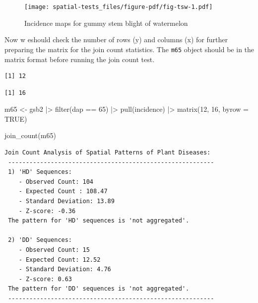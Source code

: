 \documentclass[
  letterpaper,
]{book}
\newenvironment{Shaded}{\begin{snugshade}}{\end{snugshade}}
\newcommand{\AttributeTok}[1]{\textcolor[rgb]{0.40,0.45,0.13}{#1}}
\newcommand{\ConstantTok}[1]{\textcolor[rgb]{0.56,0.35,0.01}{#1}}
\newcommand{\DecValTok}[1]{\textcolor[rgb]{0.68,0.00,0.00}{#1}}
\newcommand{\FunctionTok}[1]{\textcolor[rgb]{0.28,0.35,0.67}{#1}}
\newcommand{\NormalTok}[1]{\textcolor[rgb]{0.00,0.23,0.31}{#1}}
\newcommand{\OtherTok}[1]{\textcolor[rgb]{0.00,0.23,0.31}{#1}}
\newcommand{\SpecialCharTok}[1]{\textcolor[rgb]{0.37,0.37,0.37}{#1}}
\begin{document}
\begin{figure}[H]

{\centering \texttt{[image: spatial-tests\_files/figure-pdf/fig-tsw-1.pdf]}

}

\caption{\label{fig-tsw}Incidence maps for gummy stem blight of
watermelon}

\end{figure}

Now w eshould check the number of rows (y) and columns (x) for further
preparing the matrix for the join count statistics. The \texttt{m65}
object should be in the matrix format before running the join count
test.

\begin{Shaded}
\end{Shaded}

\begin{verbatim}
[1] 12
\end{verbatim}

\begin{Shaded}
\end{Shaded}

\begin{verbatim}
[1] 16
\end{verbatim}

\begin{Shaded}
\begin{Highlighting}[]
\NormalTok{m65 }\OtherTok{\textless{}{-}}\NormalTok{ gsb2 }\SpecialCharTok{|\textgreater{}} 
  \FunctionTok{filter}\NormalTok{(dap }\SpecialCharTok{==} \DecValTok{65}\NormalTok{) }\SpecialCharTok{|\textgreater{}} 
  \FunctionTok{pull}\NormalTok{(incidence) }\SpecialCharTok{|\textgreater{}} 
  \FunctionTok{matrix}\NormalTok{(}\DecValTok{12}\NormalTok{, }\DecValTok{16}\NormalTok{, }\AttributeTok{byrow =} \ConstantTok{TRUE}\NormalTok{)}

\FunctionTok{join\_count}\NormalTok{(m65)}
\end{Highlighting}
\end{Shaded}

\begin{verbatim}
Join Count Analysis of Spatial Patterns of Plant Diseases:
 ----------------------------------------------------------
 1) 'HD' Sequences:
    - Observed Count: 104
    - Expected Count : 108.47
    - Standard Deviation: 13.89
    - Z-score: -0.36
 The pattern for 'HD' sequences is 'not aggregated'.

 2) 'DD' Sequences:
    - Observed Count: 15
    - Expected Count: 12.52
    - Standard Deviation: 4.76
    - Z-score: 0.63
 The pattern for 'DD' sequences is 'not aggregated'.
 ----------------------------------------------------------
\end{verbatim}
\end{document}
